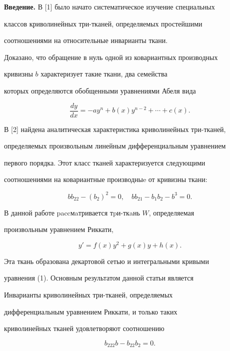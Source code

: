 \label{begin} 


 


 


 


{\bf Введение.} В [1] было начато систематическое изучение специальных 


классов криволинейных три-тканей, определяемых простейшими 


соотношениями на относительные инварианты ткани. 


Доказано, что обращение в нуль одной из ковариантных производных 


кривизны $b$ характеризует такие ткани, два семейства 


которых определяются обобщенными уравнениями Абеля вида 


$$ 


\frac{dy}{dx}=-ay^n+b(x)y^{n-2}+\dotsb+c(x). 


$$ 


В [2] найдена аналитическая характеристика криволинейных три-тканей, 


определяемых произвольным линейным дифференциальным уравнением 


первого порядка. Этот класс тканей характеризуется следующими 


соотношениями на ковариантные производныe от кривизны ткани: 


$$ 


bb_{22}-(b_2)^2=0,\quad bb_{21}-b_1b_2-b^3=0. 


$$ 


В данной работе paccмaтривается тpи-ткaнь $W$, определяемая 


произвольным уравнением Риккати, 


\begin{equation} 


y'=f(x)y^2+g(x)y+h(x). 


\end{equation} 


Эта ткань образована декартовой сетью и интегральными кривыми 


уравнения (1). Основным результатом данной статьи является 


 


 


\begin{thmnonum} 


Инварианты криволинейных три-тканей, определяемых 


дифференциальным уравнением Риккати, и только таких 


криволинейных тканей удовлетворяют соотношению 


\begin{equation} 


b_{222}b-b_{22}b_2=0. 


\end{equation} 


\end{thmnonum} 


